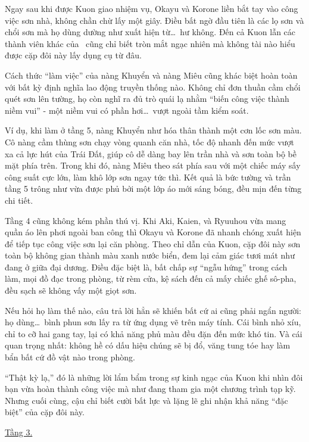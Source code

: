 \documentclass[../main.tex]{subfiles}
\begin{document}
Ngay sau khi được Kuon giao nhiệm vụ, Okayu và Korone liền bắt tay vào công việc sơn nhà, không chần chừ lấy một giây. Điều bất ngờ đầu tiên là các lọ sơn và chổi sơn mà họ dùng dường như xuất hiện từ\dots\ hư không. Đến cả Kuon lẫn các thành viên khác của \hll\ cũng chỉ biết tròn mắt ngạc nhiên mà không tài nào hiểu được cặp đôi này lấy dụng cụ từ đâu.

Cách thức ``làm việc'' của nàng Khuyển và nàng Miêu cũng khác biệt hoàn toàn với bất kỳ định nghĩa lao động truyền thống nào. Không chỉ đơn thuần cầm chổi quét sơn lên tường, họ còn nghĩ ra đủ trò quái lạ nhằm ``biến công việc thành niềm vui'' - một niềm vui có phần hơi\dots\ vượt ngoài tầm kiểm soát.

Ví dụ, khi làm ở tầng 5, nàng Khuyển như hóa thân thành một cơn lốc sơn màu. Cô nàng cầm thùng sơn chạy vòng quanh căn nhà, tốc độ nhanh đến mức vượt xa cả lực hút của Trái Đất, giúp cô dễ dàng bay lên trần nhà và sơn toàn bộ bề mặt phía trên. Trong khi đó, nàng Miêu theo sát phía sau với một chiếc máy sấy công suất cực lớn, làm khô lớp sơn ngay tức thì. Kết quả là bức tường và trần tầng 5 trông như vừa được phủ bởi một lớp áo mới sáng bóng, đều mịn đến từng chi tiết.

Tầng 4 cũng không kém phần thú vị. Khi Aki, Kaien, và Ryuuhou vừa mang quần áo lên phơi ngoài ban công thì Okayu và Korone đã nhanh chóng xuất hiện để tiếp tục công việc sơn lại căn phòng. Theo chỉ dẫn của Kuon, cặp đôi này sơn toàn bộ không gian thành màu xanh nước biển, đem lại cảm giác tươi mát như đang ở giữa đại dương. Điều đặc biệt là, bất chấp sự ``ngẫu hứng'' trong cách làm, mọi đồ đạc trong phòng, từ rèm cửa, kệ sách đến cả mấy chiếc ghế sô-pha, đều sạch sẽ không vấy một giọt sơn.

Nếu hỏi họ làm thế nào, câu trả lời hẳn sẽ khiến bất cứ ai cũng phải ngẩn người: họ dùng\dots\ bình phun sơn lấy ra từ ứng dụng vẽ trên máy tính. Cái bình nhỏ xíu, chỉ to cỡ hai gang tay, lại có khả năng phủ màu đều đặn đến mức khó tin. Và cái quan trọng nhất: không hề có dấu hiệu chúng sẽ bị đổ, văng tung tóe hay làm bẩn bất cứ đồ vật nào trong phòng.

``Thật kỳ lạ,'' đó là những lời lẩm bẩm trong sự kinh ngạc của Kuon khi nhìn đôi bạn vừa hoàn thành công việc mà như đang tham gia một chương trình tạp kỹ. Nhưng cuối cùng, cậu chỉ biết cười bất lực và lặng lẽ ghi nhận khả năng ``đặc biệt'' của cặp đôi này.

\begin{center}
    \uline{Tầng 3.}
\end{center}
\end{document}
